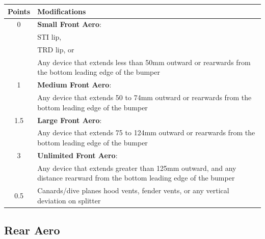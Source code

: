 \documentclass{article}
\newenvironment{legallist}{
    \begin{enumerate}[label*=\arabic*.]
}{
    \end{enumerate}
}
\newenvironment{mods}{
    \begin{longtable}{c p{6in}}
    \toprule
    \textbf{Points} & \textbf{Modifications} \\
    \midrule
}{
    \bottomrule
    \end{longtable}
}
\begin{document}
\begin{legallist}
			\begin{mods}
				0 & \textbf{Small Front Aero}: \\
                & STI lip, \\
                & TRD lip, or \\ 
                & Any device that extends less than 50mm outward or rearwards from the bottom leading edge of the bumper \\
				\midrule
				1 & \textbf{Medium Front Aero}: \\
                & Any device that extends 50 to 74mm outward or rearwards from the bottom leading edge of the bumper \\
				\midrule
				1.5 & \textbf{Large Front Aero}: \\
                & Any device that extends 75 to 124mm outward or rearwards from the bottom leading edge of the bumper \\
				\midrule
				3 & \textbf{Unlimited Front Aero}: \\
                & Any device that extends greater than 125mm outward, and any distance rearward from the bottom leading edge of the bumper \\
				\midrule
				0.5 & Canards/dive planes hood vents, fender vents, or any vertical deviation on splitter \\
			\end{mods}
						
			\subsection*{Rear Aero}
						

\end{legallist}
\end{document}
